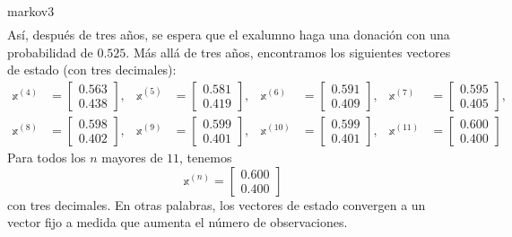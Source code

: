 \begin{examplebox}{}{markov3}
\begin{align*}
    \end{align*}
    Así, después de tres años, se espera que el exalumno haga una donación con una probabilidad de $0.525$. Más allá de tres años, encontramos los siguientes vectores de estado (con tres decimales):
    \begin{align*}
        \mathbb{x}^{(4)} & = \begin{bmatrix} 0.563 \\ 0.438 \end{bmatrix}, & \mathbb{x}^{(5)} & = \begin{bmatrix} 0.581 \\ 0.419 \end{bmatrix}, & \mathbb{x}^{(6)} & = \begin{bmatrix} 0.591 \\ 0.409 \end{bmatrix}, & \mathbb{x}^{(7)} & = \begin{bmatrix} 0.595 \\ 0.405 \end{bmatrix}, \\
        \mathbb{x}^{(8)} & = \begin{bmatrix} 0.598 \\ 0.402 \end{bmatrix}, & \mathbb{x}^{(9)} & = \begin{bmatrix} 0.599 \\ 0.401 \end{bmatrix}, & \mathbb{x}^{(10)} & = \begin{bmatrix} 0.599 \\ 0.401 \end{bmatrix}, & \mathbb{x}^{(11)} & = \begin{bmatrix} 0.600 \\ 0.400 \end{bmatrix}
    \end{align*}
    Para todos los $n$ mayores de $11$, tenemos
    $$\mathbb{x}^{(n)} = \begin{bmatrix} 0.600 \\ 0.400 \end{bmatrix}$$
    con tres decimales. En otras palabras, los vectores de estado convergen a un vector fijo a medida que aumenta el número de observaciones.
\end{examplebox}

